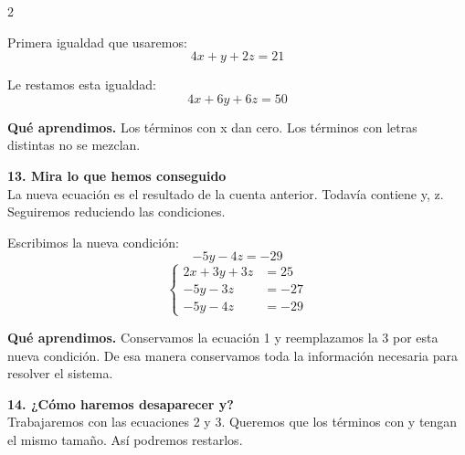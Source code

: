 \documentclass[11pt,a4paper,landscape]{article}
\begin{document}
\begin{multicols*}{2}
\begin{minipage}{\linewidth}
\par{}\par\smallskip
\par\smallskip Primera igualdad que usaremos:
\[4x + y + 2z = 21\]
\par\smallskip Le restamos esta igualdad:
\[4x + 6y + 6z = 50\]
\par\smallskip\textbf{Qué aprendimos.} Los términos con x dan cero. Los términos con letras distintas no se mezclan.
\end{minipage}\par\medskip
\noindent\begin{minipage}{\linewidth}\textbf{13. Mira lo que hemos conseguido}\\[2pt]La nueva ecuación es el resultado de la cuenta anterior. Todavía contiene y, z. Seguiremos reduciendo las condiciones.
\par\smallskip Escribimos la nueva condición:
\[-5y - 4z = -29\]
\[\left\{\begin{aligned}2x + 3y + 3z &= 25\\-5y - 3z &= -27\\-5y - 4z &= -29\end{aligned}\right.\]
\par\smallskip\textbf{Qué aprendimos.} Conservamos la ecuación 1 y reemplazamos la 3 por esta nueva condición. De esa manera conservamos toda la información necesaria para resolver el sistema.
\end{minipage}\par\medskip
\noindent\begin{minipage}{\linewidth}\textbf{14. ¿Cómo haremos desaparecer y?}\\[2pt]Trabajaremos con las ecuaciones 2 y 3. Queremos que los términos con y tengan el mismo tamaño. Así podremos restarlos.

\end{minipage}
\end{multicols*}
\end{document}
